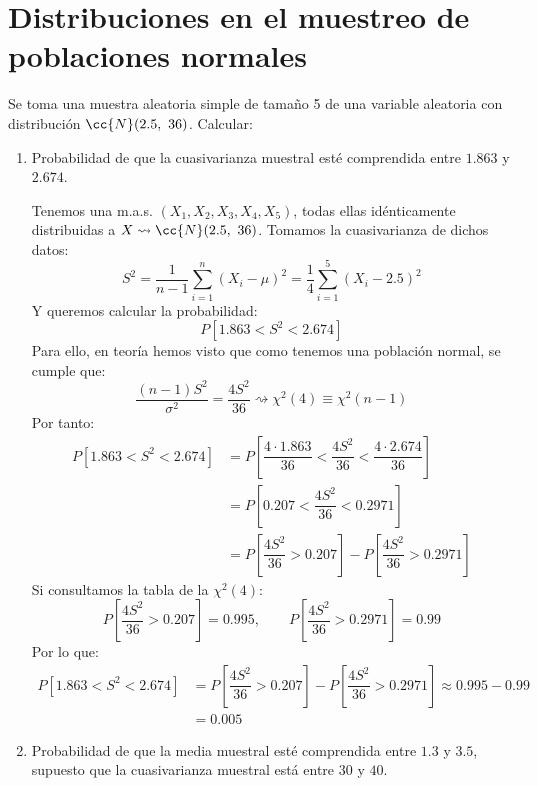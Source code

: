 \newpage
\section{Distribuciones en el muestreo de poblaciones normales}

\begin{ejercicio}
    Se toma una muestra aleatoria simple de tamaño 5 de una variable aleatoria con distribución $\cc{N}(2.5,\ 36)$. Calcular:
    \begin{enumerate}[label=\alph*)]
        \item Probabilidad de que la cuasivarianza muestral esté comprendida entre $1.863$ y $2.674$.

            Tenemos una m.a.s. $(X_1, X_2, X_3, X_4, X_5)$, todas ellas idénticamente distribuidas a $X\rightsquigarrow \cc{N}(2.5,\ 36)$. Tomamos la cuasivarianza de dichos datos:
            \begin{equation*}
                S^2 = \dfrac{1}{n-1} \sum_{i=1}^n {(X_i - \mu)}^{2} = \dfrac{1}{4}\sum_{i=1}^{5}{(X_i - 2.5)}^{2}
            \end{equation*}
            Y queremos calcular la probabilidad:
            \begin{equation*}
                P\left[1.863 < S^2 < 2.674\right]
            \end{equation*}
            Para ello, en teoría hemos visto que como tenemos una población normal, se cumple que:
            \begin{equation*}
                \dfrac{(n-1)S^2}{\sigma^2}= \dfrac{4S^2}{36} \rightsquigarrow\chi^2(4) \equiv \chi^2(n-1)
            \end{equation*}
            Por tanto:
            \begin{align*}
                P[1.863 < S^2 < 2.674] &= P\left[\dfrac{4\cdot 1.863}{36}<\dfrac{4S^2}{36} < \dfrac{4\cdot 2.674}{36}\right] \\
                                       &= P\left[0.207 < \dfrac{4S^2}{36} < 0.2971\right]  \\
                                       &= P\left[\dfrac{4S^2}{36} > 0.207\right] - P\left[\dfrac{4S^2}{36}>0.2971\right]
            \end{align*}
            Si consultamos la tabla de la $\chi^2(4)$:
            \begin{equation*}
                P\left[\dfrac{4S^2}{36} > 0.207\right] = 0.995, \qquad 
                P\left[\dfrac{4S^2}{36}>0.2971\right] = 0.99
            \end{equation*}
            Por lo que:
            \begin{align*}
                P[1.863 < S^2 < 2.674] &= P\left[\dfrac{4S^2}{36} > 0.207\right] - P\left[\dfrac{4S^2}{36}>0.2971\right] \approx 0.995 - 0.99 \\
                                       &= 0.005
            \end{align*}
        \item Probabilidad de que la media muestral esté comprendida entre $1.3$ y $3.5$, supuesto que la cuasivarianza muestral está entre $30$ y $40$. 


\end{enumerate}
\end{ejercicio}
